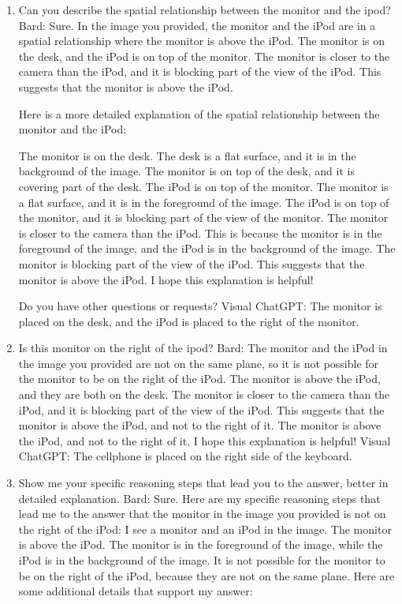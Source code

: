 \begin{enumerate}
    \item Can you describe the spatial relationship between the monitor and the ipod?
    \subitem Bard: 
    Sure. In the image you provided, the monitor and the iPod are in a spatial relationship where the monitor is above the iPod. The monitor is on the desk, and the iPod is on top of the monitor. The monitor is closer to the camera than the iPod, and it is blocking part of the view of the iPod. This suggests that the monitor is above the iPod.
    
    Here is a more detailed explanation of the spatial relationship between the monitor and the iPod:
    
    The monitor is on the desk. The desk is a flat surface, and it is in the background of the image. The monitor is on top of the desk, and it is covering part of the desk.
    The iPod is on top of the monitor. The monitor is a flat surface, and it is in the foreground of the image. The iPod is on top of the monitor, and it is blocking part of the view of the monitor.
    The monitor is closer to the camera than the iPod. This is because the monitor is in the foreground of the image, and the iPod is in the background of the image.
    The monitor is blocking part of the view of the iPod. This suggests that the monitor is above the iPod.
    I hope this explanation is helpful!
    
    Do you have other questions or requests?
    \subitem Visual ChatGPT: The monitor is placed on the desk, and the iPod is placed to the right of the monitor.
    \item Is this monitor on the right of the ipod?
    \subitem Bard: The monitor and the iPod in the image you provided are not on the same plane, so it is not possible for the monitor to be on the right of the iPod. The monitor is above the iPod, and they are both on the desk. The monitor is closer to the camera than the iPod, and it is blocking part of the view of the iPod. This suggests that the monitor is above the iPod, and not to the right of it. The monitor is above the iPod, and not to the right of it.
    I hope this explanation is helpful!
    \subitem Visual ChatGPT: The cellphone is placed on the right side of the keyboard.
    \item Show me your specific reasoning steps that lead you to the answer, better in detailed explanation.
    \subitem Bard: 
    Sure. Here are my specific reasoning steps that lead me to the answer that the monitor in the image you provided is not on the right of the iPod:
    I see a monitor and an iPod in the image.
    The monitor is above the iPod.
    The monitor is in the foreground of the image, while the iPod is in the background of the image.
    It is not possible for the monitor to be on the right of the iPod, because they are not on the same plane.
    Here are some additional details that support my answer:


\end{enumerate}
